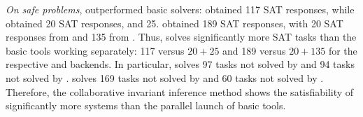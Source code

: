 \textit{On safe problems}, \theringenCICI{} outperformed basic solvers: \ringenCICI{\cvc{}} obtained 117 SAT responses, while \racer{} obtained 20 SAT responses, and \ringen{\cvc{}} 25. \ringenCICI{\vampire{}} obtained 189 SAT responses, with 20 SAT responses from \racer{} and 135 from \ringen{\vampire{}}.
Thus, \theringenCICI{} solves significantly more SAT tasks than the basic tools working separately: 117 versus $20+25$ and 189 versus $20+135$ for the respective \cvc{} and \vampire{} backends.
In particular, \ringenCICI{\cvc{}} solves 97 tasks not solved by \racer{} and 94 tasks not solved by \ringen{\cvc{}}.
\ringenCICI{\vampire{}} solves 169 tasks not solved by \racer{} and 60 tasks not solved by \ringen{\vampire{}}.
Therefore, the collaborative invariant inference method shows the satisfiability of significantly more systems than the parallel launch of basic tools.

